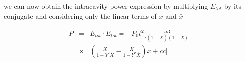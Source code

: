 we can now obtain the intracavity power expression by multiplying $E_{tot}$ by its conjugate
and considering only the linear terms of $x$ and $\bar{x}$

%
%

\begin{align}
P&=&E_{tot}\cdot \overline{E}_{tot}=-P_0t^2 [ \frac{ikY}{(1-\overline{X})(1-X)}\nonumber\\ 
&\times &\left( \frac{X}{1-Y^2 X}-\frac{\overline{X}}{1-Y^2\overline{X}} \right) x + cc ]
\end{align}

